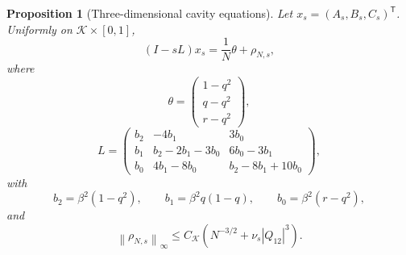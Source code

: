 \documentclass[11pt]{article}
\numberwithin{equation}{section}
\theoremstyle{plain}
\newtheorem{proposition}[theorem]{Proposition}
\theoremstyle{definition}
\newcommand{\1}{\mathbf 1}
\newcommand{\cK}{\mathcal K}
\newcommand{\norm}[1]{\left\lVert #1\right\rVert}
\begin{document}
\begin{proposition}[Three-dimensional cavity equations]
\label{prop:cavity}
Let $x_s=(A_s,B_s,C_s)^{\mathsf T}$.  Uniformly on
$\cK\times[0,1]$,
\begin{equation}
 (I-sL)x_s=\frac1N\theta+\rho_{N,s},
 \label{eq:cavitysystem}
\end{equation}
where
\begin{equation}
 \theta=
 \begin{pmatrix}
 1-q^2\\ q-q^2\\ r-q^2
 \end{pmatrix},
 \label{eq:theta}
\end{equation}
\begin{equation}
 L=
 \begin{pmatrix}
 b_2&-4b_1&3b_0\\
 b_1&b_2-2b_1-3b_0&6b_0-3b_1\\
 b_0&4b_1-8b_0&b_2-8b_1+10b_0
 \end{pmatrix},
 \label{eq:L}
\end{equation}
with
\begin{equation}
 b_2=\beta^2(1-q^2),\qquad
 b_1=\beta^2q(1-q),\qquad
 b_0=\beta^2(r-q^2),
 \label{eq:bs}
\end{equation}
and
\begin{equation}
 \norm{\rho_{N,s}}_\infty
 \le C_{\cK}
 \left(N^{-3/2}+\nu_s|Q_{12}|^3\right).
 \label{eq:rho}
\end{equation}
\end{proposition}
\end{document}
